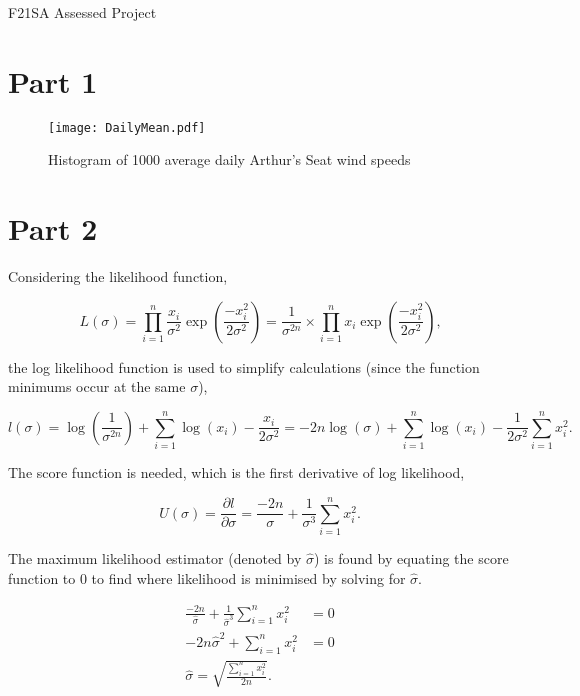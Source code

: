 \documentclass[11pt]{article}
\begin{document}
\begin{center}
    \Large{F21SA Assessed Project}
\end{center}

\section*{Part 1}

\begin{figure}[ht]
    \centering
	\texttt{[image: DailyMean.pdf]}
    \caption{Histogram of 1000 average daily Arthur's Seat wind speeds}
    \label{fig:histogram}
\end{figure}

\section*{Part 2}

Considering the likelihood function,

$$
    L(\sigma) = \prod_{i=1}^n{ \frac{x_i}{\sigma^2} \exp\left( \frac{-x_i^2}{2 \sigma^2} \right)}
    = \frac{1}{\sigma^{2n}} \times \prod_{i=1}^n{ x_i \exp\left( \frac{-x_i^2}{2 \sigma^2} \right)} \text{,}
$$

the log likelihood function is used to simplify calculations (since the function minimums occur at the same $\sigma$),

$$
    l(\sigma) = \log\left(\frac{1}{\sigma^{2n}}\right) + \sum_{i=1}^n{ \log(x_i) - \frac{x_i}{2 \sigma^2} }
    = -2n \log(\sigma) + \sum_{i=1}^n{\log(x_i)} - \frac{1}{2 \sigma^2} \sum_{i=1}^n{x_i^2} \text{.}
$$

The score function is needed, which is the first derivative of log likelihood,

$$
    U(\sigma) = \frac{\partial l}{\partial \sigma} = \frac{-2n}{\sigma} + \frac{1}{\sigma^3} \sum_{i=1}^n{x_i^2} \text{.}
$$

The maximum likelihood estimator (denoted by $ \hat\sigma $) is found by equating the score function to 0 to find where likelihood is minimised
by solving for $ \hat\sigma $.

\begin{align*}
    \frac{-2n}{\hat{\sigma}} + \frac{1}{\hat{\sigma}^3} \sum_{i=1}^n{x_i^2} &= 0 \\
    -2n \hat\sigma^2 + \sum_{i=1}^n{x_i^2} &= 0 \\
    \hat\sigma = \sqrt{\frac{\sum_{i=1}^n{x_i^2}}{2n}} \text{.}
\end{align*}
\end{document}
